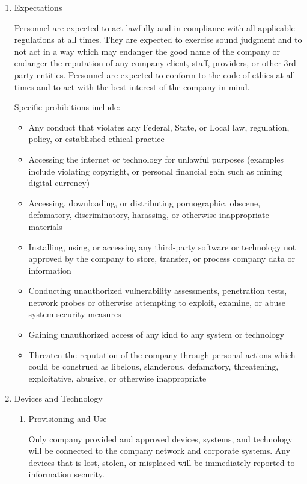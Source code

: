 \documentclass[stu]{apa7}
\begin{document}
\begin{enumerate}
\item Expectations
\label{sec:org2579fab}

Personnel are expected to act lawfully and in compliance with all applicable regulations at all times. They are expected to exercise sound judgment and to not act in a way which may endanger the good name of the company or endanger the reputation of any company client, staff, providers, or other 3rd party entities. Personnel are expected to conform to the code of ethics at all times and to act with the best interest of the company in mind.

Specific prohibitions include:

\begin{itemize}
\item Any conduct that violates any Federal, State, or Local law, regulation, policy, or established ethical practice
\item Accessing the internet or technology for unlawful purposes (examples include violating copyright, or personal financial gain such as mining digital currency)
\item Accessing, downloading, or distributing pornographic, obscene, defamatory, discriminatory, harassing, or otherwise inappropriate materials
\item Installing, using, or accessing any third-party software or technology not approved by the company to store, transfer, or process company data or information
\item Conducting unauthorized vulnerability assessments, penetration tests, network probes or otherwise attempting to exploit, examine, or abuse system security measures
\item Gaining unauthorized access of any kind to any system or technology
\item Threaten the reputation of the company through personal actions which could be construed as libelous, slanderous, defamatory, threatening, exploitative, abusive, or otherwise inappropriate
\end{itemize}

\item Devices and Technology
\label{sec:orgf2ccd00}

\begin{enumerate}
\item Provisioning and Use
\label{sec:org416e534}

Only company provided and approved devices, systems, and technology will be connected to the company network and corporate systems. Any devices that is lost, stolen, or misplaced will be immediately reported to information security.


\end{enumerate}
\end{enumerate}
\end{document}
